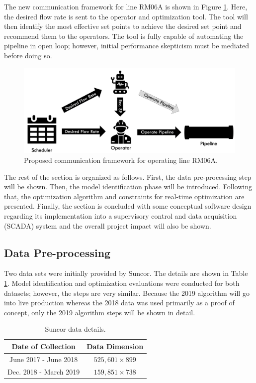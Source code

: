 The new communication framework for line RM06A is shown in Figure \ref{fig:08scheduleV2}. Here, the desired flow rate is sent to the operator and optimization tool.  The tool will then identify the most effective set points to achieve the desired set point and recommend them to the operators.  The tool is fully capable of automating the pipeline in open loop; however, initial performance skepticism must be mediated before doing so.

\begin{figure}[h]
    \centering
    \includegraphics[scale=0.35]{images/08ScheduleV2.png}
    \caption{Proposed communication framework for operating line RM06A.}
    \label{fig:08scheduleV2}
\end{figure}

The rest of the section is organized as follows.  First, the data pre-processing step will be shown.  Then, the model identification phase will be introduced.  Following that, the optimization algorithm and constraints for real-time optimization are presented.  Finally, the section is concluded with some conceptual software design regarding its implementation into a supervisory control and data acquisition (SCADA) system and the overall project impact will also be shown.

\subsection{Data Pre-processing}
Two data sets were initially provided by Suncor.  The details are shown in Table \ref{tab:08data}. Model identification and optimization evaluations were conducted for both datasets; however, the steps are very similar.  Because the 2019 algorithm will go into live production whereas the 2018 data was used primarily as a proof of concept, only the 2019 algorithm steps will be shown in detail.

\begin{table}[h]
    \centering
    {
    \begin{tabular}{ c | c }
        Date of Collection     &      Data Dimension      \\
        \hline
        June 2017 - June 2018  &    $525,601 \times 899$   \\
        Dec. 2018 - March 2019 &    $159,851 \times 738$   \\
    \end{tabular}}
    \caption{Suncor data details.}
    \label{tab:08data}
\end{table}

